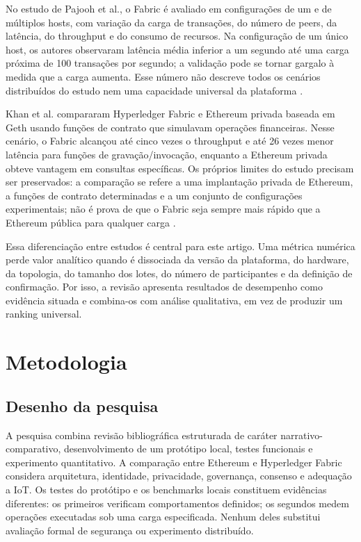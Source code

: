 \documentclass[10pt,a4paper,twocolumn]{article}
\begin{document}
No estudo de Pajooh et al., o Fabric é avaliado em configurações de um e de múltiplos hosts, com variação da carga de transações, do número de peers, da latência, do throughput e do consumo de recursos. Na configuração de um único host, os autores observaram latência média inferior a um segundo até uma carga próxima de 100 transações por segundo; a validação pode se tornar gargalo à medida que a carga aumenta. Esse número não descreve todos os cenários distribuídos do estudo nem uma capacidade universal da plataforma \cite{Pajooh2022}.

Khan et al. compararam Hyperledger Fabric e Ethereum privada baseada em Geth usando funções de contrato que simulavam operações financeiras. Nesse cenário, o Fabric alcançou até cinco vezes o throughput e até 26 vezes menor latência para funções de gravação/invocação, enquanto a Ethereum privada obteve vantagem em consultas específicas. Os próprios limites do estudo precisam ser preservados: a comparação se refere a uma implantação privada de Ethereum, a funções de contrato determinadas e a um conjunto de configurações experimentais; não é prova de que o Fabric seja sempre mais rápido que a Ethereum pública para qualquer carga \cite{Khan2025}.

Essa diferenciação entre estudos é central para este artigo. Uma métrica numérica perde valor analítico quando é dissociada da versão da plataforma, do hardware, da topologia, do tamanho dos lotes, do número de participantes e da definição de confirmação. Por isso, a revisão apresenta resultados de desempenho como evidência situada e combina-os com análise qualitativa, em vez de produzir um ranking universal.

\section{Metodologia}
\subsection{Desenho da pesquisa}
A pesquisa combina revisão bibliográfica estruturada de caráter narrativo-comparativo, desenvolvimento de um protótipo local, testes funcionais e experimento quantitativo. A comparação entre Ethereum e Hyperledger Fabric considera arquitetura, identidade, privacidade, governança, consenso e adequação a IoT. Os testes do protótipo e os benchmarks locais constituem evidências diferentes: os primeiros verificam comportamentos definidos; os segundos medem operações executadas sob uma carga especificada. Nenhum deles substitui avaliação formal de segurança ou experimento distribuído.
\end{document}
